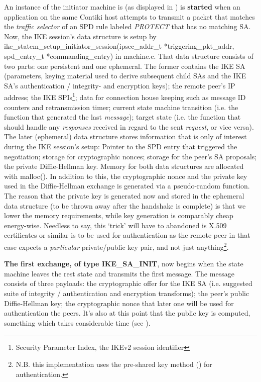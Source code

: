 \documentclass[final,a4paper,twoside,11pt,onecolumn]{report}
\begin{document}
An instance of the initiator machine is (as displayed in ) is \textbf{started} when an application on the same Contiki host attempts to transmit a packet that matches the \emph{traffic selector} of an SPD rule labeled \emph{PROTECT} that has no matching SA. Now, the IKE session's data structure is setup by ike\_\-statem\_\-setup\_\-initiator\_\-session(ipsec\_addr\_t *triggering\_pkt\_addr, spd\_entry\_t *commanding\_entry) in machine.c. That data structure consists of two parts: one persistent and one ephemeral. The former contains the IKE SA (parameters, keying material used to derive subsequent child SAs and the IKE SA's authentication / integrity- and encryption keys); the remote peer's IP address; the IKE SPIs\footnote{Security Parameter Index, the IKEv2 session identifier}; data for connection house keeping such as message ID counters and retransmission timer; current state machine transition (i.e. the function that generated the last \emph{message}); target state (i.e. the function that should handle any \emph{responses} received in regard to the sent \emph{request}, or vice versa). The later (ephemeral) data structure stores information that is only of interest during the IKE session's setup: Pointer to the SPD entry that triggered the negotiation; storage for cryptographic nonces; storage for the peer's SA proposals; the private Diffie-Hellman key. Memory for both data structures are allocated with malloc(). In addition to this, the cryptographic nonce and the private key used in the Diffie-Hellman exchange is generated via a pseudo-random function. The reason that the private key is generated now and stored in the ephemeral data structure (to be thrown away after the handshake is complete) is that we lower the memory requirements, while key generation is comparably cheap energy-wise. Needless to say, this `trick' will have to abandoned is X.509 certificates or similar is to be used for authentication as the remote peer in that case expects a \emph{particular} private/public key pair, and not just anything\footnote{N.B. this implementation uses the pre-shared key method (\citep[p.49]{rfc5996}) for authentication.}.

\textbf{The first exchange, of type IKE\_SA\_INIT}, now begins when the state machine leaves the rest state and transmits the first message. The message consists of three payloads: the cryptographic offer for the IKE SA (i.e. suggested suite of integrity / authentication and encryption transforms); the peer's public Diffie-Hellman key; the cryptographic nonce that later one will be used for authentication the peers. It's also at this point that the public key is computed, something which takes considerable time (see ).
\end{document}
